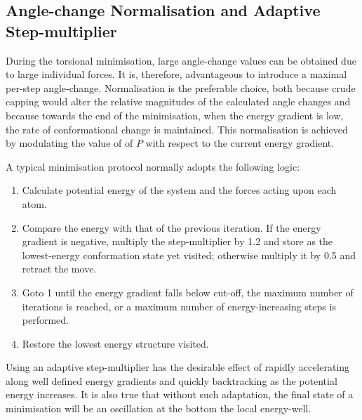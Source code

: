 \subsection{Angle-change Normalisation and Adaptive Step-multiplier}

During the torsional minimisation, large angle-change values can be obtained due to large individual forces. It is, therefore, advantageous to introduce a maximal per-step angle-change. Normalisation is the preferable choice, both because crude capping would alter the relative magnitudes of the calculated angle changes and because towards the end of the minimisation, when the energy gradient is low, the rate of conformational change is maintained.
This normalisation is achieved by modulating the value of
of $P$ with respect to the current energy gradient.

A typical minimisation protocol normally adopts the following logic:

\begin{enumerate} \isep
\item Calculate potential energy of the system and the forces acting upon each atom. 
\item Compare the energy with that of the previous iteration. If the energy gradient is negative, multiply the step-multiplier by 1.2 and store as the lowest-energy conformation state yet visited; otherwise multiply it by 0.5 and retract the move.
\item Goto 1 until the energy gradient falls below cut-off, the maximum number of iterations is reached, or a maximum number of energy-increasing steps is performed.
\item Restore the lowest energy structure visited.
\end{enumerate}
Using an adaptive step-multiplier has the desirable effect of rapidly accelerating along well defined energy gradients and quickly backtracking as the potential energy increases.
It is also true that without such adaptation, the final state of a minimisation will be an oscillation at the bottom the local energy-well.

